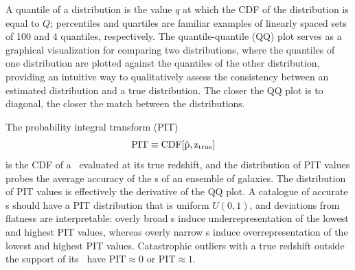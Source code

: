 A quantile of a distribution is the value $q$ at which the CDF of the distribution is equal to $Q$; percentiles and quartiles are familiar examples of linearly spaced sets of 100 and 4 quantiles, respectively.
The quantile-quantile (QQ) plot serves as a graphical visualization for comparing two distributions, where the quantiles of one distribution are plotted against the quantiles of the other distribution, providing an intuitive way to qualitatively assess the consistency between an estimated distribution and a true distribution.
The closer the QQ plot is to diagonal, the closer the match between the distributions.

The probability integral transform (PIT)
\begin{align}
\eqlabel{eq:pit}
\mathrm{PIT} &\equiv \rm{CDF}[\hat{p}, z_{\rm true}]
\end{align}
is the CDF of a \pzpdf\ evaluated at its true redshift, and the distribution of PIT values probes the average accuracy of the \pzpdf s of an ensemble of galaxies.
The distribution of PIT values is effectively the derivative of the QQ plot.
A catalogue of accurate \pzpdf s should have a PIT distribution that is uniform $U(0,1)$, and deviations from flatness are interpretable: overly broad \pzpdf s induce underrepresentation of the lowest and highest PIT values, whereas overly narrow \pzpdf s induce overrepresentation of the lowest and highest PIT values.
Catastrophic outliers with a true redshift outside the support of its \pzpdf\ have $\mathrm{PIT} \approx 0$ or $\mathrm{PIT} \approx 1$.

